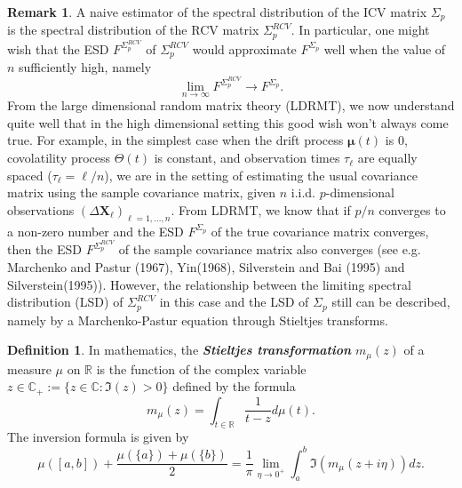 \documentclass[a4paper,11pt]{article}
\theoremstyle{plain}
\theoremstyle{definition}
\newtheorem{defn}[thm]{Definition}
\newtheorem{rmrk}[thm]{Remark}
\newcommand{\MR}{\mathbb{R}}
\newcommand{\define}[1]{\textit{\textbf{#1}}}
\begin{document}
	\begin{rmrk}
		A naive estimator of the spectral distribution of the ICV matrix $\Sigma_p$ is the spectral distribution of the RCV matrix $\Sigma_p^{RCV}$. In particular, one might wish that the ESD $F^{\Sigma_p^{RCV}}$ of $\Sigma_p^{RCV}$ would approximate $F^{\Sigma_p}$ well when the value of $n$ sufficiently high, namely
		\[ \lim_{n \rightarrow \infty} F^{\Sigma_p^{RCV}} \rightarrow F^{\Sigma_p}. \]
		From the large dimensional random matrix theory (LDRMT), we now understand quite well that in the high dimensional setting this good wish won't always come true. For example, in the simplest case when the drift process $\boldsymbol{\mu}(t)$ is $0$, covolatility process $\Theta(t)$ is constant, and observation times $\tau_\ell$ are equally spaced ($\tau_\ell = \ell / n$), we are in the setting of estimating the usual covariance matrix using the sample covariance matrix, given $n$ i.i.d. $p$-dimensional observations $(\Delta \mathbf{X}_\ell)_{\ell=1, \dots, n}$. From LDRMT, we know that if $p/n$ converges to a non-zero number and the ESD $F^{\Sigma_p}$ of the true covariance matrix converges, then the ESD $F^{\Sigma_p^{RCV}}$ of the sample covariance matrix also converges (see e.g. Marchenko and Pastur (1967), Yin(1968), Silverstein and Bai (1995) and Silverstein(1995)). However, the relationship between the limiting spectral distribution (LSD) of $\Sigma_p^{RCV}$ in this case and the LSD of $\Sigma_p$ still can be described, namely by a Marchenko-Pastur equation through Stieltjes transforms.
	\end{rmrk}
	
	\begin{defn}
		In mathematics, the \define{Stieltjes transformation} $m_\mu(z)$ of a measure $\mu$ on $\MR$ is the function of the complex variable $z \in \mathbb{C}_+ := \{ z \in \mathbb{C} : \Im(z)>0 \}$ defined by the formula
		\[  
		m_\mu(z) = \int_{t \in \MR} \frac{1}{t - z} d\mu(t).
		\]
		The inversion formula is given by
		\begin{equation} \label{inverse Stieltjes transform}
		\mu([a, b]) + \frac{\mu(\{a\}) + \mu(\{b\})}{2}  = \frac{1}{\pi} \lim_{\eta \rightarrow 0^+} \int_{a}^{b} \Im (m_\mu(z+i\eta)) dz.
		\end{equation}
	\end{defn}
	
\end{document}
